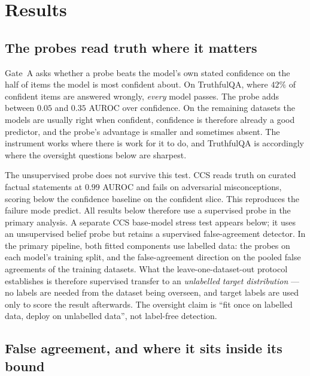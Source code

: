 \section{Results}
\label{sec:results}

\subsection{The probes read truth where it matters}

Gate~A asks whether a probe beats the model's own stated confidence on the half
of items the model is most confident about. On TruthfulQA, where $42\%$ of
confident items are answered wrongly, \emph{every} model passes. The probe adds
between $0.05$ and $0.35$ AUROC over confidence. On the remaining datasets the
models are usually right when confident, confidence is therefore already a good
predictor, and the probe's advantage is smaller and sometimes absent. The
instrument works where there is work for it to do, and TruthfulQA is accordingly
where the oversight questions below are sharpest.

The unsupervised probe does not survive this test. CCS reads truth on curated
factual statements at $0.99$ AUROC and fails on adversarial misconceptions,
scoring below the confidence baseline on the confident slice. This reproduces
the failure mode \citet{farquhar2024challenges} predict. All results below therefore
use a supervised probe in the primary analysis. A separate CCS base-model
stress test appears below; it uses an unsupervised belief probe but retains a
supervised false-agreement detector. In the primary pipeline, both fitted
components use labelled data: the probes on each model's training split, and the
false-agreement direction on the pooled false agreements of the training datasets. What the
leave-one-dataset-out protocol establishes is therefore supervised transfer to
an \emph{unlabelled target distribution} --- no labels are needed from the
dataset being overseen, and target labels are used only to score the result
afterwards. The oversight claim is ``fit once on labelled data, deploy on
unlabelled data'', not label-free detection.

\subsection{False agreement, and where it sits inside its bound}

